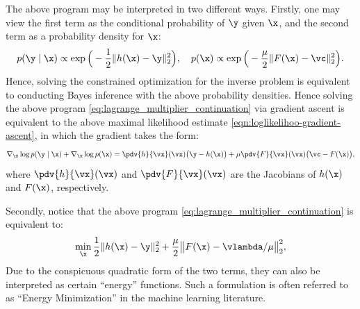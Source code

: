 \documentclass[../../book-main.tex]{subfiles}
\begin{document}
The above program may be interpreted in two different ways. Firstly, one may view the first term as the conditional probability of $\y$ given $\x$, and the second term as a probability density for $\x$:
\begin{equation}
  p(\y\mid \x) \propto \exp\Big(- \frac{1}{2}\|h(\x) - \y\|_2^2\Big), \quad 
    p(\x) \propto \exp\Big( - \frac{\mu}{2}\|F(\x) - \vc\|_2^2\Big).
\end{equation} 
Hence, solving the constrained optimization for the inverse problem is equivalent to conducting Bayes inference with the above probability densities. Hence solving the above program \eqref{eq:lagrange_multiplier_continuation} via gradient ascent is equivalent to the above maximal likelihood estimate \eqref{eqn:loglikelihoo-gradient-ascent}, 
in which the gradient  takes the form:
\begin{equation}
   \nabla_{\x} \log p(\y \mid \x) + \nabla_{\x} \log p(\x)   =  \pdv{h}{\vx}(\vx)\big(\y - h(\x)\big) + \mu \pdv{F}{\vx}(\vx)\big(\vc - F(\x)\big),
\end{equation}
where $\pdv{h}{\vx}(\vx)$ and $\pdv{F}{\vx}(\vx)$ are the Jacobians of $h(\x)$ and $F(\x)$, respectively.

Secondly, notice that the above program \eqref{eq:lagrange_multiplier_continuation} is equivalent to:
\begin{equation}
\min_{\x} \frac{1}{2}\|h(\x) - \y\|_2^2 + \frac{\mu}{2} \big\|F(\x) - \vlambda/\mu\big\|_2^2,
\label{eqn:energy-minimization}
\end{equation} 
Due to the conspicuous quadratic form of the two terms, they can also be interpreted as certain ``energy'' functions. Such a formulation is often referred to as ``Energy Minimization'' in the machine learning literature.  

\end{document}
